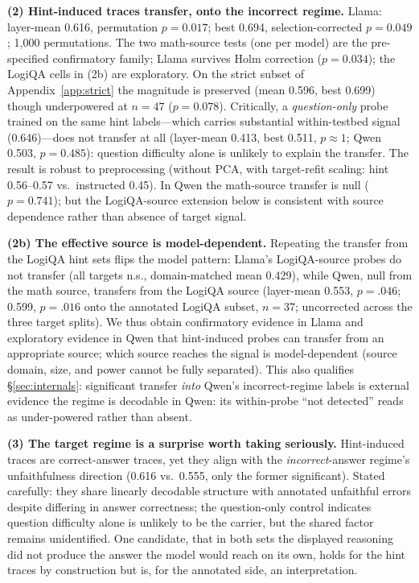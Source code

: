\documentclass[11pt]{article}
\begin{document}
\textbf{(2) Hint-induced traces transfer, onto the incorrect regime.} Llama: layer-mean 0.616, permutation $p{=}0.017$; best 0.694, selection-corrected $p{=}0.049$; 1{,}000 permutations. The two math-source tests (one per model) are the pre-specified confirmatory family; Llama survives Holm correction ($p{=}0.034$); the LogiQA cells in (2b) are exploratory. On the strict subset of Appendix~\ref{app:strict} the magnitude is preserved (mean 0.596, best 0.699) though underpowered at $n{=}47$ ($p{=}0.078$). Critically, a \emph{question-only} probe trained on the same hint labels---which carries substantial within-testbed signal (0.646)---does not transfer at all (layer-mean 0.413, best 0.511, $p{\approx}1$; Qwen 0.503, $p{=}0.485$): question difficulty alone is unlikely to explain the transfer. The result is robust to preprocessing (without PCA, with target-refit scaling: hint 0.56--0.57 vs.\ instructed 0.45). In Qwen the math-source transfer is null ($p{=}0.741$); but the LogiQA-source extension below is consistent with source dependence rather than absence of target signal.

\textbf{(2b) The effective source is model-dependent.} Repeating the transfer from the LogiQA hint sets flips the model pattern: Llama's LogiQA-source probes do not transfer (all targets n.s., domain-matched mean 0.429), while Qwen, null from the math source, transfers from the LogiQA source (layer-mean 0.553, $p{=}.046$; 0.599, $p{=}.016$ onto the annotated LogiQA subset, $n{=}37$; uncorrected across the three target splits). We thus obtain confirmatory evidence in Llama and exploratory evidence in Qwen that hint-induced probes can transfer from an appropriate source; which source reaches the signal is model-dependent (source domain, size, and power cannot be fully separated). This also qualifies \S\ref{sec:internals}: significant transfer \emph{into} Qwen's incorrect-regime labels is external evidence the regime is decodable in Qwen: its within-probe ``not detected'' reads as under-powered rather than absent.

\textbf{(3) The target regime is a surprise worth taking seriously.} Hint-induced traces are correct-answer traces, yet they align with the \emph{incorrect}-answer regime's unfaithfulness direction (0.616 vs.\ 0.555, only the former significant). Stated carefully: they share linearly decodable structure with annotated unfaithful errors despite differing in answer correctness; the question-only control indicates question difficulty alone is unlikely to be the carrier, but the shared factor remains unidentified. One candidate, that in both sets the displayed reasoning did not produce the answer the model would reach on its own, holds for the hint traces by construction but is, for the annotated side, an interpretation.
\end{document}
